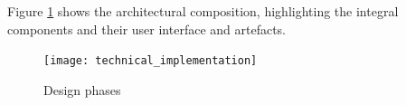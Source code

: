 Figure \ref{fig:technical_implementation} shows the architectural composition, highlighting the integral components and their user interface and artefacts.
\begin{figure}[h]
	\centering 
	\texttt{[image: technical\_implementation]}
	\caption{Design phases}\label{fig:technical_implementation}
\end{figure}

